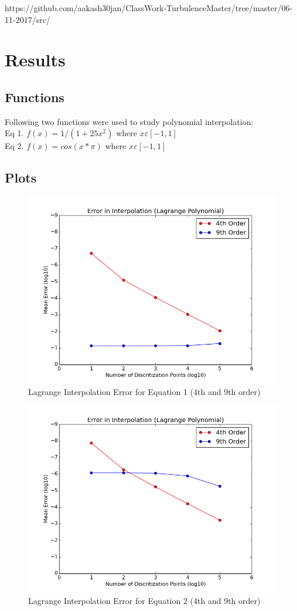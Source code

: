 \documentclass[preprint,12pt,3p]{elsarticle}
\begin{document}
https://github.com/aakash30jan/ClassWork-TurbulenceMaster/tree/master/06-11-2017/src/
\newpage
\section{Results}
\subsection{Functions}
Following two functions were used to study polynomial interpolation:
\\Eq 1. $f(x)=1/(1+25x^{2})$     where     $x \varepsilon [-1,1] $\\
Eq 2. $f(x)=cos(x*\pi)$     where     $x \varepsilon [-1,1] $

\subsection{Plots}
 \begin{figure}
\centering
\includegraphics[width=0.7\linewidth]{eq1_lag.png}
\caption{Lagrange Interpolation Error for Equation 1 (4th and 9th order)}
\label{fig:eq1_lag}
\end{figure}


 \begin{figure}
\centering
\includegraphics[width=0.7\linewidth]{eq2_lag.png}
\caption{Lagrange Interpolation Error for Equation 2 (4th and 9th order)}
\label{fig:eq2_lag}
\end{figure}
\end{document}
